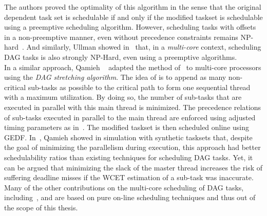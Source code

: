 \documentclass[main.tex]{subfiles}
\begin{document}
The authors proved the optimality of this algorithm in the sense that the original dependent task set is schedulable if and only if the modified taskset is schedulable using a preemptive scheduling algorithm. However, scheduling tasks with offsets in a non-preemptive manner, even without precedence constraints remains NP-hard~\cite{Lenstra1977}. And similarly, Ullman showed in~\cite{Ullman1975} that, in a \emph{multi-core} context, scheduling DAG tasks is also strongly NP-Hard, even using a preemptive algorithms. \\ 

In a similar approach, Qamieh \etal~\cite{Qamhieh2013, Qamhieh2014} adapted the method of~\cite{Chetto1990} to multi-core processors using the \emph{DAG stretching algorithm}. The idea of is to append as many non-critical sub-tasks as possible to the critical path to form one sequential thread with a maximum utilization. By doing so, the number of sub-tasks that are executed in parallel with this main thread is minimized. The precedence relations of sub-tasks executed in parallel to the main thread are enforced using adjusted timing parameters as in~\cite{Chetto1990}. The modified taskset is then scheduled online using GEDF. In~\cite{Qamhieh2014}, Qamieh \etal showed in simulation with synthetic tasksets that, despite the goal of minimizing the parallelism during execution, this approach had better schedulability ratios than existing techniques for scheduling DAG tasks. Yet, it can be argued that minimizing the slack of the master thread increases the risk of suffering deadline misses if the WCET estimation of a sub-task was inaccurate. \\

Many of the other contributions on the multi-core scheduling of DAG tasks, including~\cite{Baruah2012_RTSS}, \cite{Li13} and \cite{Bonifaci2013} are based on pure on-line scheduling techniques and thus out of the scope of this thesis.
\end{document}
